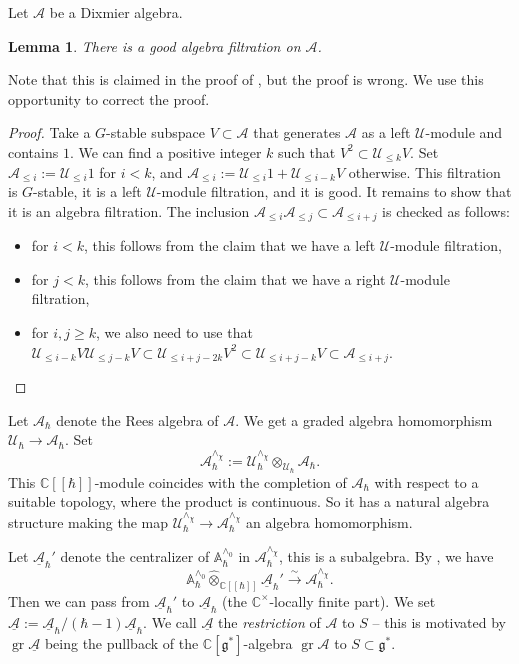 \documentclass[12pt]{amsart}
\newcommand{\C}{\mathbb{C}}
\newcommand{\A}{\mathcal{A}}
\newcommand{\U}{\mathcal{U}}
\newcommand{\g}{\mathfrak{g}}
\newcommand{\gr}{\operatorname{gr}}
\newcommand{\Weyl}{\mathbb{A}}
\newtheorem{Lem}[Thm]{Lemma}
\theoremstyle{definition}
\numberwithin{equation}{section}
\begin{document}
Let $\A$ be a Dixmier algebra.

\begin{Lem}\label{Lem:Dixmier_good_filtration}
There is a good algebra filtration on $\A$.
\end{Lem}

Note that this is claimed in the proof of \cite[Lemma 3.4.5]{HC}, but the proof is wrong.
We use this opportunity to correct the proof.

\begin{proof}
Take a $G$-stable subspace $V\subset \A$ that generates $\A$ as a left $\U$-module and contains
$1$. We can find a positive integer $k$ such that $V^2\subset \U_{\leqslant k}V$.
Set $\A_{\leqslant i}:=\U_{\leqslant i}1$ for $i<k$, and $\A_{\leqslant i}:=\U_{\leqslant i}1+\U_{\leqslant i-k}V$ otherwise. This filtration is $G$-stable, it is a left $\U$-module filtration, and it is good.
It remains to show that it is an algebra filtration. The inclusion $\A_{\leqslant i}\A_{\leqslant j}
\subset \A_{\leqslant i+j}$ is checked as follows:
\begin{itemize}
\item for $i<k$, this follows from the claim that we have a left $\U$-module filtration,
\item for $j<k$, this follows from the claim that we have a right $\U$-module filtration,
\item for $i,j\geqslant k$, we also need to use that $\U_{\leqslant i-k}V\U_{\leqslant j-k}V
\subset \U_{\leqslant i+j-2k}V^2\subset \U_{\leqslant i+j-k}V\subset \A_{\leqslant i+j}$.
\end{itemize}
\end{proof}



Let $\A_\hbar$ denote the Rees algebra of $\A$. We get
a graded algebra homomorphism $\U_\hbar\rightarrow \A_\hbar$.  Set
$$\A_{\hbar}^{\wedge_\chi}:=\U_\hbar^{\wedge_\chi}\otimes_{\U_\hbar}\A_\hbar.$$
This $\C[[\hbar]]$-module coincides with the completion of $\A_\hbar$ with respect to a suitable
topology, where the product is continuous. So it has a natural algebra structure making the map
$\U_\hbar^{\wedge_\chi}\rightarrow \A_\hbar^{\wedge_\chi}$ an algebra
homomorphism.

Let $\underline{\A}_\hbar'$ denote the centralizer of $\Weyl_\hbar^{\wedge_0}$
in $\A_\hbar^{\wedge_\chi}$, this is a subalgebra.  By \cite[Proposition 3.3.1]{HC},
we have
\begin{equation}\label{eq:decomp_A}
\Weyl_\hbar^{\wedge_0}\widehat{\otimes}_{\C[[\hbar]]}\underline{\A}_\hbar'
\xrightarrow{\sim} \A_\hbar^{\wedge_\chi}.
\end{equation}
Then we can pass from $\underline{\A}_\hbar'$ to $\underline{\A}_\hbar$
(the $\C^\times$-locally finite part). We set $\underline{\A}:=\underline{\A}_\hbar/(\hbar-1)\underline{\A}_\hbar$.
We call $\underline{\A}$ the {\it restriction} of $\A$ to $S$ -- this is motivated
by $\gr\underline{\A}$ being the pullback of the $\C[\g^*]$-algebra $\gr\A$
to $S\subset \g^*$.
\end{document}
